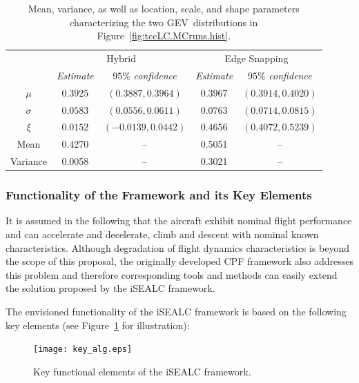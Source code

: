 \documentclass[letter,onecolumn,12pt]{aiaa-tc}
\newcommand{\1}{1_n}
\begin{document}

\begin{table}[t]
    \centering
    \caption[Characterization of the GEV~distributions in Fig.~\ref{fig:tccLC.MCruns.hist}.]{Mean, variance, as well as location, scale, and shape parameters characterizing the two GEV~distributions in Figure~\ref{fig:tccLC.MCruns.hist}.}
    \label{tbl:tccLC.MCruns.GEVfit}
    \renewcommand{\arraystretch}{1.2}
    \begin{tabular}{c | c c | c c}
    \hline\hline
    \hspace{1cm} & \multicolumn{2}{c|}{Hybrid} & \multicolumn{2}{c}{Edge Snapping} \\
    & \emph{Estimate} & $95\%$ \emph{confidence} & \emph{Estimate} & $95\%$ \emph{confidence} \\
    \hline
    $\mu$ & $0.3925$ & $(0.3887,0.3964)$ & $0.3967$ & $( 0.3914,0.4020)$ \\
    $\sigma$  & $0.0583$ & $(0.0556,0.0611)$ & $0.0763$ & $(0.0714,0.0815)$ \\
    $\xi$  & $0.0152$ & $(-0.0139,0.0442)$ & $0.4656$ & $(0.4072,0.5239)$ \\
    \hline
    Mean     & 0.4270 & -- & 0.5051 & -- \\
    Variance & 0.0058 & -- & 0.3021 & -- \\
    \hline\hline
  	\end{tabular}
\end{table}

\subsubsection{Functionality of the Framework and its Key Elements}
\label{subsubsec:functionality}
It is assumed in the following that the aircraft exhibit nominal flight performance and can accelerate and decelerate, climb and descent with nominal known characteristics.  Although degradation of flight dynamics characteristics is beyond the scope of this proposal, the originally developed CPF framework also addresses this problem and therefore corresponding tools and methods can easily extend the solution proposed by the iSEALC framework.

The envisioned functionality of the iSEALC framework is based on the following key elements (see Figure~\ref{fig:KeyAlg} for illustration):
%
\begin{figure}[thpb]
\centering
\vspace{-0mm}
\texttt{[image: key\_alg.eps]}
\caption{Key functional elements of the iSEALC framework.}
\label{fig:KeyAlg}
\end{figure}
\vspace{-1mm}
\end{document}
